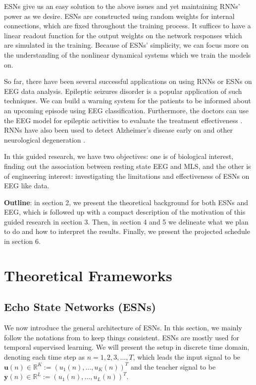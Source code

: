 \documentclass[a4paper,11pt,oneside]{article}
\begin{document}
ESNs give us an easy solution to the above issues and yet maintaining RNNs' power as we desire. ESNs are constructed using random weights for internal connections, which are fixed throughout the training process. It 
suffices to have a linear readout function for the output weights on the network responses which are simulated in the training.
Because of ESNs' simplicity, we can focus more on the understanding of the nonlinear dynamical systems which we train the models on.

So far, there have been several successful applications on using RNNs or ESNs on EEG data analysis. Epileptic seizures disorder is a popular application of such techniques. We can build a warning system for the patients to be informed about an upcoming episode using EEG classification. Furthermore, the doctors can use the EEG model for epileptic activities to evaluate the treatment effectiveness \cite{buteneers2008real} \cite{naderi2010analysis}.  RNNs have also been used to detect Alzheimer's disease early on and other neurological degeneration  \cite{petrosian2001recurrent}\cite{ubeyli2008multiclass}. 

In this guided research, we have two objectives: one is of biological interest, finding out the association between resting state EEG and MLS,
and the other is of engineering interest: investigating the limitations and effectiveness of ESNs on EEG like data.


\textbf{Outline}: in section 2, we present the theoretical background for both ESNs and EEG, which is followed up with a compact description of the motivation of this guided research in section 3. Then, in section 4 and 5 we delineate what we plan to 
do and how to interpret the results. Finally, we present the projected schedule in section 6. 

\section{Theoretical Frameworks}
\subsection{Echo State Networks (ESNs)}
We now introduce the general architecture of ESNs. In this section, we mainly  follow the notations from \cite{jaeger2001echo}\cite{lukovsevivcius2012practical} to keep things consistent. ESNs are mostly used for temporal supervised learning. We will present the setup in discrete time domain, denoting each time step as $ n = 1, 2, 3, \dots, T $, which leads the input signal to be $ \mathbf{u}(n) \in \mathbb{R}^K := (u_1(n), \dots, u_K(n))^T$ and the teacher signal to be 
$ \mathbf{y}(n) \in \mathbb{R}^L := (u_1(n), \dots, u_L(n))^T$. 
\end{document}
